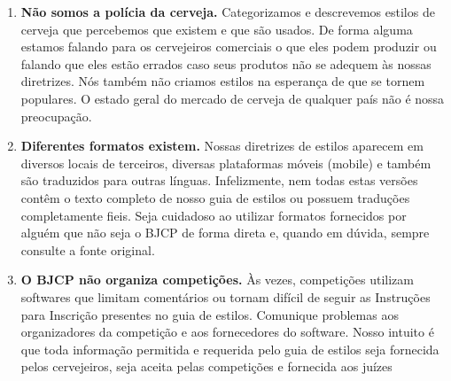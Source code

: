\begin{enumerate}
\item \textbf{Não somos a polícia da cerveja.} Categorizamos e descrevemos estilos de cerveja que percebemos que existem e que são usados. De forma alguma estamos falando para os cervejeiros comerciais o que eles podem produzir ou falando que eles estão errados caso seus produtos não se adequem às nossas diretrizes. Nós também não criamos estilos na esperança de que se tornem populares. O estado geral do mercado de cerveja de qualquer país não é nossa preocupação.
\item \textbf{Diferentes formatos existem.} Nossas diretrizes de estilos aparecem em diversos locais de terceiros, diversas plataformas móveis (mobile) e também são traduzidos para outras línguas. Infelizmente, nem todas estas versões contêm o texto completo de nosso guia de estilos ou possuem traduções completamente fieis. Seja cuidadoso ao utilizar formatos fornecidos por alguém que não seja o BJCP de forma direta e, quando em dúvida, sempre consulte a fonte original.
\item \textbf{O BJCP não organiza competições.} Às vezes, competições utilizam softwares que limitam comentários ou tornam difícil de seguir as Instruções para Inscrição presentes no guia de estilos. Comunique problemas aos organizadores da competição e aos fornecedores do software. Nosso intuito é que toda informação permitida e requerida pelo guia de estilos seja fornecida pelos cervejeiros, seja aceita pelas competições e fornecida aos juízes
\end{enumerate}

